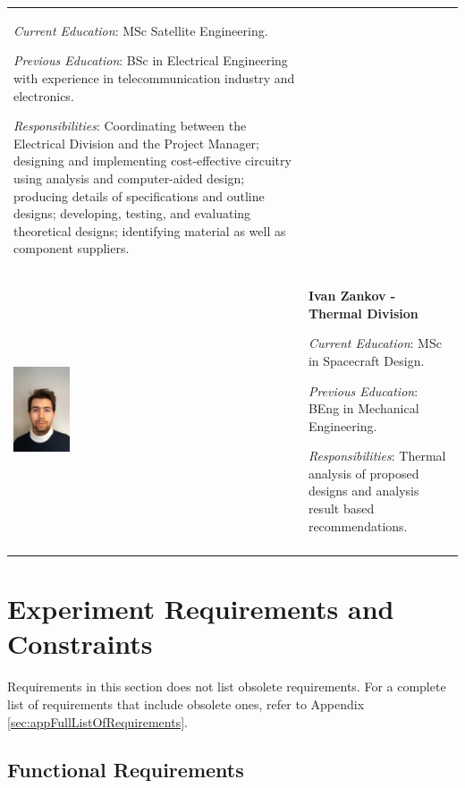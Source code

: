 \documentclass[a4paper,12pt,twoside]{article}
\begin{document}
\begin{longtable}[]{m{} m{}}
\smallskip
\textit{Current Education}: MSc Satellite Engineering.

\smallskip
\textit{Previous Education}: BSc in Electrical Engineering with experience in telecommunication industry and electronics.

\smallskip
\textit{Responsibilities}: Coordinating between the Electrical Division and the Project Manager; designing and implementing cost-effective circuitry using analysis and computer-aided design; producing details of specifications and outline designs; developing, testing, and evaluating theoretical designs; identifying material as well as component suppliers. 
\bigskip
\\


\includegraphics[width=0.2\textwidth]{1-introduction/img/ivan-zankov.jpg} & \textbf{Ivan Zankov - Thermal Division}

\smallskip
\textit{Current Education}: MSc in Spacecraft Design.

\smallskip
\textit{Previous Education}: BEng in Mechanical Engineering.

\smallskip
\textit{Responsibilities}: Thermal analysis of proposed designs and analysis result based recommendations.                                                         

\\
\label{tab:people}
\end{longtable}
\raggedbottom

\pagebreak
\section{Experiment Requirements and Constraints}
Requirements in this section does not list obsolete requirements. For a complete list of requirements that include obsolete ones, refer to Appendix \ref{sec:appFullListOfRequirements}.

\subsection{Functional Requirements}
\end{document}
